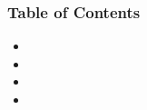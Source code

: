 



\begin{frame}
    \frametitle{ Table of Contents}
    \begin{itemize}
	\item
    
     
	\item 
	  
	\item
		
   	 \item 
   	   
    \end{itemize}
\end{frame}

